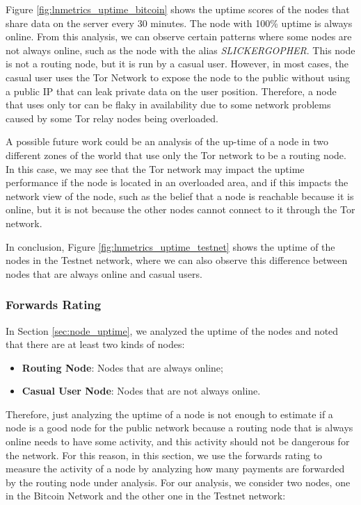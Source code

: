 Figure \ref{fig:lnmetrics_uptime_bitcoin} shows the uptime scores
of the nodes that share data on the server every 30 minutes.
The node with 100\% uptime is always online. From this analysis,
we can observe certain patterns where some nodes are not always
online, such as the node with the alias \emph{SLICKERGOPHER}.
This node is not a routing node, but it is run by a casual user.
However, in most cases, the casual user uses the Tor Network \cite{tor}
to expose the {\LN} node to the public without using a public IP
that can leak private data on the user position. Therefore, a node
that uses only tor can be flaky in availability due to some network
problems caused by some Tor relay nodes being overloaded.

A possible future work could be an analysis of the up-time of a node
in two different zones of the world that use only the Tor network to
be a routing node. In this case, we may see that the Tor network may
impact the uptime performance if the node is located in an overloaded
area, and if this impacts the network view of the node, such as the
belief that a node is reachable because it is online, but it is
not because the other nodes cannot connect to it through the Tor network.

In conclusion, Figure \ref{fig:lnmetrics_uptime_testnet} shows the uptime of
the nodes in the Testnet network, where we can also observe this
difference between nodes that are always online and casual users.

\subsubsection{Forwards Rating}
\label{sec:forwards_rating}

In Section \ref{sec:node_uptime}, we analyzed the uptime of the nodes 
and noted that there are at least two kinds of nodes:

\begin{itemize}
    \item {\bf Routing Node}: Nodes that are always online;
    \item {\bf Casual User Node}: Nodes that are not always online.
\end{itemize}

Therefore, just analyzing the uptime of a node is not enough to estimate if a node is a 
good node for the public network because a routing node that is always online needs to 
have some activity, and this activity should not be dangerous for the network.
For this reason, in this section, we use the forwards rating to measure the activity of 
a node by analyzing how many payments are forwarded by the routing node under analysis. 
For our analysis, we consider two nodes, one in the Bitcoin Network and the other 
one in the Testnet network:

